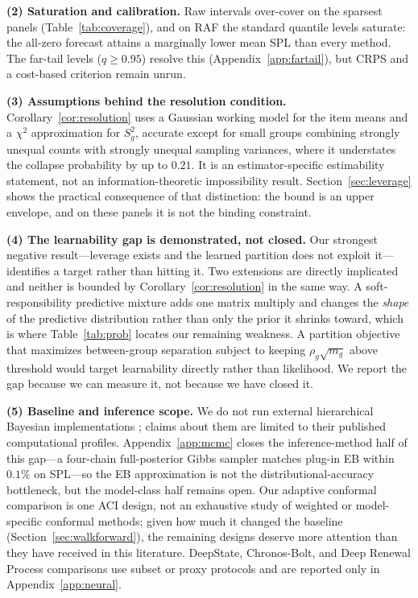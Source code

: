 \documentclass[twocolumn,10pt]{article}
\theoremstyle{definition}
\begin{document}
\textbf{(2) Saturation and calibration.} Raw intervals over-cover on the
sparsest panels (Table~\ref{tab:coverage}), and on RAF the standard
quantile levels saturate: the all-zero forecast attains a marginally lower
mean SPL than every method. The far-tail levels ($q\ge0.95$) resolve this
(Appendix~\ref{app:fartail}), but CRPS and a cost-based criterion remain
unrun.

\textbf{(3) Assumptions behind the resolution condition.}
Corollary~\ref{cor:resolution} uses a Gaussian working model for the item
means and a $\chi^2$ approximation for $S_g^2$, accurate except for small
groups combining strongly unequal counts with strongly unequal sampling
variances, where it understates the collapse probability by up to $0.21$.
It is an estimator-specific estimability statement, not an
information-theoretic impossibility result. Section~\ref{sec:leverage}
shows the practical consequence of that distinction: the bound is an upper
envelope, and on these panels it is not the binding constraint.

\textbf{(4) The learnability gap is demonstrated, not closed.} Our
strongest negative result---leverage exists and the learned partition does
not exploit it---identifies a target rather than hitting it. Two
extensions are directly implicated and neither is bounded by
Corollary~\ref{cor:resolution} in the same way. A soft-responsibility
predictive mixture adds one matrix multiply and changes the \emph{shape}
of the predictive distribution rather than only the prior it shrinks
toward, which is where Table~\ref{tab:prob} locates our remaining
weakness. A partition objective that maximizes between-group separation
subject to keeping $\rho_g\sqrt{m_g}$ above threshold would target
learnability directly rather than likelihood. We report the gap because we
can measure it, not because we have closed it.

\textbf{(5) Baseline and inference scope.} We do not run external
hierarchical Bayesian implementations
\citep{chapados2014,seeger2016,pitkin2024}; claims about them are limited
to their published computational profiles.
Appendix~\ref{app:mcmc} closes the inference-method half of this gap---a
four-chain full-posterior Gibbs sampler matches plug-in EB within $0.1\%$
on SPL---so the EB approximation is not the distributional-accuracy
bottleneck, but the model-class half remains open. Our adaptive conformal
comparison is one ACI design, not an exhaustive study of weighted or
model-specific conformal methods; given how much it changed the baseline
(Section~\ref{sec:walkforward}), the remaining designs deserve more
attention than they have received in this literature. DeepState,
Chronos-Bolt, and Deep Renewal Process comparisons use subset or proxy
protocols and are reported only in Appendix~\ref{app:neural}.
\end{document}
